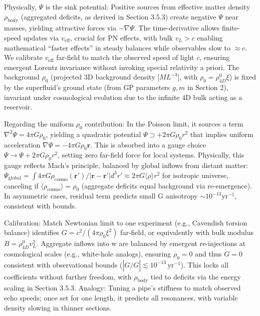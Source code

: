 \documentclass{article}
\begin{document}
Physically, $\Psi$ is the sink potential: Positive sources from effective matter density $\rho_{\text{body}}$ (aggregated deficits, as derived in Section 3.5.3) create negative $\Psi$ near masses, yielding attractive forces via $-\nabla \Psi$. The time-derivative allows finite-speed updates via $v_{\text{eff}}$, crucial for PN effects, with bulk $v_L > c$ enabling mathematical ``faster effects'' in steady balances while observables slow to $\approx c$. We calibrate $v_{\text{eff}}$ far-field to match the observed speed of light $c$, ensuring emergent Lorentz invariance without invoking special relativity a priori. The background $\rho_0$ (projected 3D background density [$M L^{-3}$], with $\rho_0 = \rho_{4D}^0 \xi$) is fixed by the superfluid's ground state (from GP parameters $g, m$ in Section 2), invariant under cosmological evolution due to the infinite 4D bulk acting as a reservoir.

Regarding the uniform $\rho_0$ contribution: In the Poisson limit, it sources a term $\nabla^2 \Psi = 4\pi G \rho_0$, yielding a quadratic potential $\Psi \supset +2\pi G \rho_0 r^2$ that implies uniform acceleration $\nabla \Psi = -4\pi G \rho_0 \mathbf{r}$. This is absorbed into a gauge choice $\Psi \to \Psi + 2\pi G \rho_0 r^2$, setting zero far-field force for local systems. Physically, this gauge reflects Mach's principle, balanced by global inflows from distant matter: $\Psi_{\text{global}} = \int 4\pi G \rho_{\text{cosmo}}(\mathbf{r}') / |\mathbf{r} - \mathbf{r}'| d^3 r' \approx 2\pi G \langle \rho \rangle r^2$ for isotropic universe, canceling if $\langle \rho_{\text{cosmo}} \rangle = \rho_0$ (aggregate deficits equal background via re-emergence). In asymmetric cases, residual term predicts small G anisotropy $\sim 10^{-13} \mathrm{yr}^{-1}$, consistent with bounds.

Calibration: Match Newtonian limit to one experiment (e.g., Cavendish torsion balance) identifies $G = c^2 / (4\pi \rho_0 \xi^2)$ far-field, or equivalently with bulk modulus $B = \rho_{4D}^0 v_L^2$. Aggregate inflows into w are balanced by emergent re-injections at cosmological scales (e.g., white-hole analogs), ensuring $\dot{\rho_0} = 0$ and thus $\dot{G} = 0$ consistent with observational bounds ($ |\dot{G}/G| \lesssim 10^{-13} \, \mathrm{yr}^{-1} $). This locks all coefficients without further freedom, with $\rho_{\text{body}}$ tied to deficits via the energy scaling in Section 3.5.3. Analogy: Tuning a pipe's stiffness to match observed echo speeds; once set for one length, it predicts all resonances, with variable density slowing in thinner sections.
\end{document}
